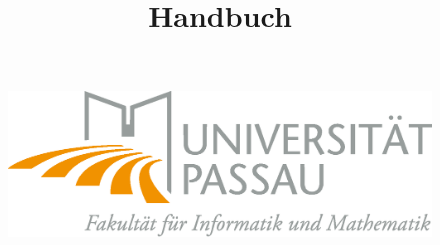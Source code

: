 \documentclass[10pt]{scrreprt}
\begin{document}
\thispagestyle{empty}
\sffamily
 
\title{Handbuch}

\begin{figure}
\begin{flushright}
	\includegraphics[scale=0.4]{uniLogo.eps}
\vspace{2.0 cm}
\end{flushright}
\end{figure}
\end{document}
